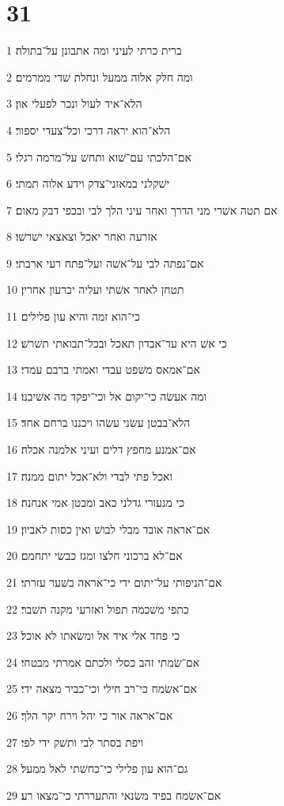 \chapter{31}

\par 1 ברית כרתי לעיני ומה אתבונן על־בתולה׃
\par 2 ומה חלק אלוה ממעל ונחלת שׁדי ממרמים׃
\par 3 הלא־איד לעול ונכר לפעלי און׃
\par 4 הלא־הוא יראה דרכי וכל־צעדי יספור׃
\par 5 אם־הלכתי עם־שׁוא ותחשׁ על־מרמה רגלי׃
\par 6 ישׁקלני במאזני־צדק וידע אלוה תמתי׃
\par 7 אם תטה אשׁרי מני הדרך ואחר עיני הלך לבי ובכפי דבק מאום׃
\par 8 אזרעה ואחר יאכל וצאצאי ישׁרשׁו׃
\par 9 אם־נפתה לבי על־אשׁה ועל־פתח רעי ארבתי׃
\par 10 תטחן לאחר אשׁתי ועליה יכרעון אחרין׃
\par 11 כי־הוא זמה והיא עון פלילים׃
\par 12 כי אשׁ היא עד־אבדון תאכל ובכל־תבואתי תשׁרשׁ׃
\par 13 אם־אמאס משׁפט עבדי ואמתי ברבם עמדי׃
\par 14 ומה אעשׂה כי־יקום אל וכי־יפקד מה אשׁיבנו׃
\par 15 הלא־בבטן עשׂני עשׂהו ויכננו ברחם אחד׃
\par 16 אם־אמנע מחפץ דלים ועיני אלמנה אכלה׃
\par 17 ואכל פתי לבדי ולא־אכל יתום ממנה׃
\par 18 כי מנעורי גדלני כאב ומבטן אמי אנחנה׃
\par 19 אם־אראה אובד מבלי לבושׁ ואין כסות לאביון׃
\par 20 אם־לא ברכוני חלצו ומגז כבשׂי יתחמם׃
\par 21 אם־הניפותי על־יתום ידי כי־אראה בשׁער עזרתי׃
\par 22 כתפי משׁכמה תפול ואזרעי מקנה תשׁבר׃
\par 23 כי פחד אלי איד אל ומשׂאתו לא אוכל׃
\par 24 אם־שׂמתי זהב כסלי ולכתם אמרתי מבטחי׃
\par 25 אם־אשׂמח כי־רב חילי וכי־כביר מצאה ידי׃
\par 26 אם־אראה אור כי יהל וירח יקר הלך׃
\par 27 ויפת בסתר לבי ותשׁק ידי לפי׃
\par 28 גם־הוא עון פלילי כי־כחשׁתי לאל ממעל׃
\par 29 אם־אשׂמח בפיד משׂנאי והתעררתי כי־מצאו רע׃
